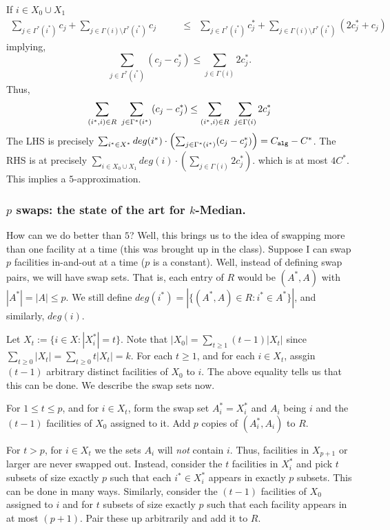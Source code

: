 \documentclass[11pt]{article}
\def\alg{{\tt alg}}
\begin{document}
\noindent
If $i\in X_0 \cup X_1$
\begin{align*}
\sum_{j\in \Gamma^*(i^*)} c_j +\sum_{j\in \Gamma(i)\setminus\Gamma^*(i^*)} c_j &\qquad \le & \sum_{j\in \Gamma^*(i^*)} c^*_j + \sum_{j\in \Gamma(i)\setminus\Gamma^*(i^*)} (2c^*_j + c_j) 
\end{align*}
implying, $$\sum_{j\in \Gamma^*(i^*)} (c_j - c^*_j)  \le  \sum_{j\in \Gamma(i)} 2c^*_j. $$
%
Thus, $$\sum_{(i^*,i)\in R}~\sum_{j\in \Gamma^*(i^*)} (c_j - c^*_j) \le \sum_{(i^*,i)\in R}~ \sum_{j\in \Gamma(i)} 2c^*_j$$
The LHS is precisely $\sum_{i^*\in X^*} deg(\i)\cdot \left(\sum_{j\in \Gamma^*(i^*)} (c_j-c^*_j)\right) = C_{\alg} - C^*$. The RHS is at precisely
$\sum_{i\in X_0\cup X_1} deg(i)\cdot \left( \sum_{j\in \Gamma(i)} 2c^*_j\right)$. which is at most $4C^*$. 
This implies a $5$-approximation. 


\subsubsection*{$p$ swaps: the state of the art for $k$-Median.}

How can we do better than $5$? Well, this brings us to the idea of swapping more than one facility at a time (this was brought up in the class). Suppose I can swap $p$ facilities in-and-out at a time ($p$ is a constant).
Well, instead of defining swap pairs, we will have swap sets. That is, each entry of $R$ would be 
$(A^*,A)$ with $|A^*| = |A| \le p$. We still define $deg(i^*) = |\{(A^*,A)\in R: i^*\in A^*\}|$, and similarly, 
$deg(i)$. 

Let $X_t := \{i\in X: |X^*_i| = t\}$. 
Note that $|X_0| = \sum_{t\ge 1} (t-1)|X_t|$ since $\sum_{t\ge 0}|X_t| = \sum_{t\ge 0}t|X_t| = k$. 
For each $t\ge 1$, and for each $i\in X_t$, assgin $(t-1)$ arbitrary distinct facilities of $X_0$ to $i$.
The above equality tells us that this can be done. We describe the swap sets now. 

For $1\le t\le p$, and for $i\in X_t$, form the swap set $A^*_i = X^*_i$ and $A_i$ being $i$ and the $(t-1)$ facilities of $X_0$ assigned to it. 
Add $p$ copies of $(A^*_i,A_i)$ to $R$.

For $t> p$, for $i\in X_t$ we the sets $A_i$ will {\em not} contain $i$. Thus, facilities in $X_{p+1}$ or larger are never swapped out. Instead, consider the $t$ facilities in $X^*_i$ and pick $t$ subsets of size exactly $p$ such that each $i^* \in X^*_i$ appears in exactly $p$ subsets. This can be done in many ways. Similarly, consider the $(t-1)$ facilities of $X_0$ assigned to $i$ and for $t$ subsets of size exactly $p$ such that each facility
appears in at most $(p+1)$. Pair these up arbitrarily and add it to $R$.
\end{document}
